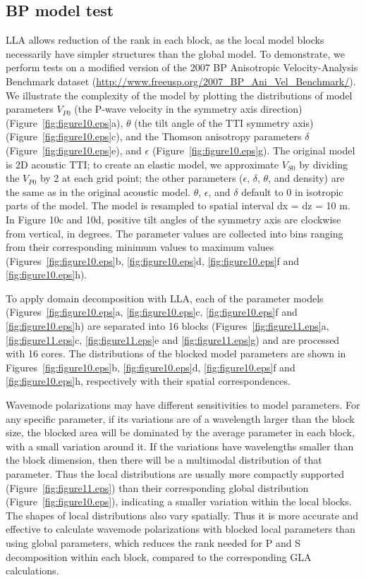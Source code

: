 \documentclass[manuscript,ulem,graphix,revised]{geophysics}
\begin{document}
\subsection{BP model test}
\indent\indent

LLA allows reduction of the rank in each block, as the local model blocks necessarily have simpler structures than the global model. To demonstrate, we perform tests on a modified version of the 2007 BP Anisotropic Velocity-Analysis Benchmark dataset (\url{http://www.freeusp.org/2007_BP_Ani_Vel_Benchmark/}).  
We illustrate the complexity of the model by plotting the distributions of model parameters $V_{P0}$ (the P-wave velocity in the symmetry axis direction) (Figure~\ref{fig:figure10.eps}a), $\theta$ (the tilt angle of the TTI symmetry axis) (Figure~\ref{fig:figure10.eps}c), and the Thomson anisotropy parameters $\delta$ (Figure~\ref{fig:figure10.eps}e), and $\epsilon$ (Figure~\ref{fig:figure10.eps}g).  The original model is 2D acoustic TTI; to create an elastic model, we approximate $V_{S0}$ by dividing the $V_{P0}$ by 2 at each grid point; the other parameters ($\epsilon$, $\delta$, $\theta$, and density) are the same as in the original acoustic model. $\theta$, $\epsilon$, and $\delta$ default to 0 in isotropic parts of the model. The model is resampled to spatial interval dx = dz = 10 m.  In Figure 10c and 10d, positive tilt angles of the symmetry axis are clockwise from vertical, in degrees.
The parameter values are collected into bins ranging from their corresponding minimum values to maximum values (Figures~\ref{fig:figure10.eps}b, \ref{fig:figure10.eps}d, \ref{fig:figure10.eps}f and \ref{fig:figure10.eps}h). 


To apply domain decomposition with LLA, each of the parameter models (Figures~\ref{fig:figure10.eps}a, \ref{fig:figure10.eps}c, \ref{fig:figure10.eps}f and \ref{fig:figure10.eps}h) are separated into 16 blocks (Figures~\ref{fig:figure11.eps}a, \ref{fig:figure11.eps}c, \ref{fig:figure11.eps}e and \ref{fig:figure11.eps}g) and are processed with 16 cores. 
The distributions of the blocked model parameters are shown in Figures~\ref{fig:figure10.eps}b, \ref{fig:figure10.eps}d, \ref{fig:figure10.eps}f and \ref{fig:figure10.eps}h, respectively with their spatial correspondences. 

Wavemode polarizations may have different sensitivities to model parameters. For any specific parameter, if its variations are of a wavelength larger than the block size, the blocked area will be dominated by the average parameter in each block, with a small variation around it. If the variations have wavelengths 
smaller than the block dimension, then there will be a multimodal distribution of that parameter.
Thus the local distributions are usually more compactly supported (Figure~\ref{fig:figure11.eps}) than their corresponding global distribution (Figure~\ref{fig:figure10.eps}), indicating a smaller variation within the local blocks. The shapes of local distributions also vary spatially. 
Thus it is more accurate and effective to calculate wavemode polarizations with blocked local parameters than using global parameters, which reduces the rank needed for P and S decomposition  within each block, compared to the corresponding GLA calculations.
\end{document}
